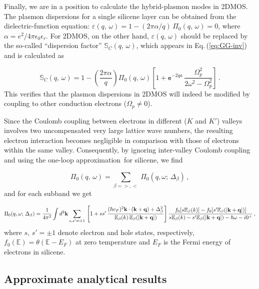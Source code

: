 \documentclass[aps,prb,showpacs]{revtex4}
\newcommand{\mbb}{\mathbb}
\begin{document}
Finally, we are in a position to calculate the hybrid-plasmon modes in 2DMOS.
The plasmon dispersions for a single silicene layer can be obtained from the dielectric-function equation: $\varepsilon(q,\,\omega) = 1 - (2\pi\alpha/q)\,\Pi_0(q,\,\omega) = 0$,
where $\alpha=e^2/4\pi\epsilon_0\epsilon_r$. For 2DMOS, on the other hand, $\varepsilon(q,\,\omega)$
should be replaced by the so-called ``dispersion factor'' $\mathbb{S}_C(q,\,\omega)$, which appears in Eq.\,(\ref{eq:GG-inv}) and is calculated as

\begin{equation}
\mathbb{S}_C(q,\,\omega) = 1 - \left(\frac{2\pi\alpha}{q}\right)\Pi_0(q,\,\omega) \left[  
1 + \texttt{e}^{-2qa} \,\frac{\Omega_p^2}{2\omega^2-\Omega_p^2}
\right]\, .
\label{sc}
\end{equation}
This verifies that the plasmon dispersions in 2DMOS will indeed be modified by coupling to other conduction electrons ($\Omega_p\neq 0$). 
\medskip

Since the Coulomb coupling between electrons in different ($K$ and $K'$) valleys involves two uncompensated
very large lattice wave numbers, the resulting electron interaction becomes negligible in comparison with those of electrons within the same valley.
Consequently, by ignoring inter-valley Coulomb coupling and using the one-loop approximation\,\cite{SilMain} for silicene, we find

\begin{equation}
\Pi_0(q,\,\omega) = \sum\limits_{\beta =>,<}\,\Pi_0(q,\omega;\,\Delta_{\beta}) \, ,
\label{sum}
\end{equation}
and for each subband we get

\begin{equation}
\Pi_0(q,\omega;\,\Delta_{\beta}) = \frac{1}{4 \pi^2} \int d^2{\bf k} \sum_{s,s'=\pm 1}\,\left[ 1 + ss'\,
\frac{(\hbar v_F)^2{\bf k \cdot ({\bf k} + {\bf q})} + \Delta_\beta^2 }{ \mbb{E}_{\beta}(k)\,\mbb{E}_{\beta}(|{ \bf k} + {\bf q}|)} \right]
\frac{f_0[s\mbb{E}_{\beta}(k)] - f_0[s'\mbb{E}_{\beta}(|{ \bf k} + {\bf q}|)]}
{s\mbb{E}_{\beta}(k)-s'\mbb{E}_{\beta}(|{ \bf k} + {\bf q}|)-\hbar\omega-i0^+}\, ,
\label{pi1p}
\end{equation}
where $s,\,s' = \pm 1$ denote electron and hole states, respectively, $f_0(\mbb{E})=\theta(\mbb{E}-E_F)$ at zero temperature and $E_F$ is the Fermi energy of electrons in silicene.
\medskip

\subsection{Approximate analytical results}
\end{document}
